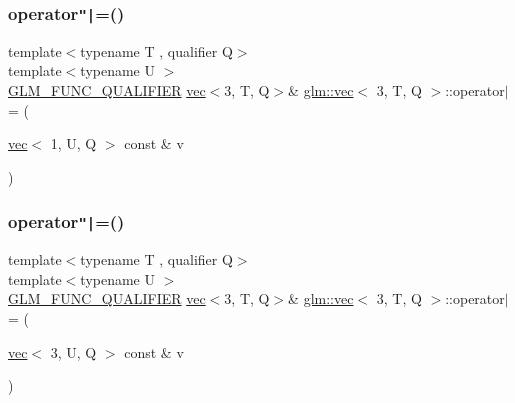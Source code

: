 \mbox{\label{structglm_1_1vec_3_013_00_01_t_00_01_q_01_4_a989756f0f4b1dfb7c3b6e07f30cbd790}} 
\subsubsection{\texorpdfstring{operator\texttt{"|}=()}{operator|=()}\hspace{0.1cm}{\footnotesize\ttfamily [5/6]}}
{\footnotesize\ttfamily template$<$typename T , qualifier Q$>$ \\
template$<$typename U $>$ \\
\mbox{\hyperlink{setup_8hpp_a33fdea6f91c5f834105f7415e2a64407}{G\+L\+M\+\_\+\+F\+U\+N\+C\+\_\+\+Q\+U\+A\+L\+I\+F\+I\+ER}} \mbox{\hyperlink{structglm_1_1vec}{vec}}$<$3, T, Q$>$\& \mbox{\hyperlink{structglm_1_1vec}{glm\+::vec}}$<$ 3, T, Q $>$\+::operator$\vert$= (\begin{DoxyParamCaption}\item[{\mbox{\hyperlink{structglm_1_1vec}{vec}}$<$ 1, U, Q $>$ const \&}]{v }\end{DoxyParamCaption})}

\mbox{\label{structglm_1_1vec_3_013_00_01_t_00_01_q_01_4_a7294cce332c6969861099356e29fbaa3}} 
\subsubsection{\texorpdfstring{operator\texttt{"|}=()}{operator|=()}\hspace{0.1cm}{\footnotesize\ttfamily [6/6]}}
{\footnotesize\ttfamily template$<$typename T , qualifier Q$>$ \\
template$<$typename U $>$ \\
\mbox{\hyperlink{setup_8hpp_a33fdea6f91c5f834105f7415e2a64407}{G\+L\+M\+\_\+\+F\+U\+N\+C\+\_\+\+Q\+U\+A\+L\+I\+F\+I\+ER}} \mbox{\hyperlink{structglm_1_1vec}{vec}}$<$3, T, Q$>$\& \mbox{\hyperlink{structglm_1_1vec}{glm\+::vec}}$<$ 3, T, Q $>$\+::operator$\vert$= (\begin{DoxyParamCaption}\item[{\mbox{\hyperlink{structglm_1_1vec}{vec}}$<$ 3, U, Q $>$ const \&}]{v }\end{DoxyParamCaption})}



